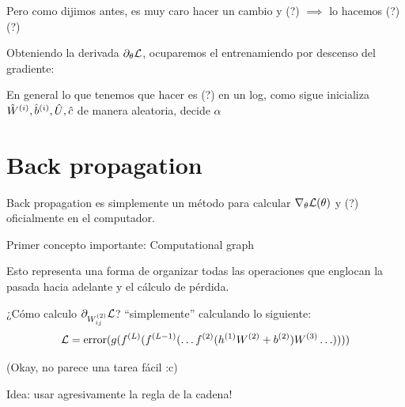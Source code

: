 Pero como dijimos antes, es muy caro hacer un cambio y (?) $\implies$ lo hacemos (?) (?)


Obteniendo la derivada $\partial_\theta \L$, ocuparemos el entrenamiendo por descenso del gradiente:
\begin{algorithm}
\end{algorithm}

En general lo que tenemos que hacer es (?) en un log, como sigue inicializa $\hat{W}\entr, \hat{b}\entr, \hat{U}, \hat{c}$ de manera aleatoria, decide $\alpha$
\begin{algorithm}
\end{algorithm}

\section{Back propagation}

Back propagation es simplemente un método para calcular $\nabla_{\theta}\L(\theta)$ y (?) oficialmente en el computador.

Primer concepto importante: Computational graph


Esto representa una forma de organizar todas las operaciones que englocan la pasada hacia adelante y el cálculo de pérdida.

¿Cómo calculo $\partial_{W_{ij}\entr[2]}\L$?
``simplemente'' calculando lo siguiente:
\begin{equation*}
    \L = \error(g(f\entr[L](f\entr[L-1](\ldots f\entr[2](h\entr[1]W\entr[2] + b\entr[2])W\entr[3] \ldots))))
\end{equation*}

(Okay, no parece una tarea fácil :c) 

Idea: usar agresivamente la regla de la cadena!

